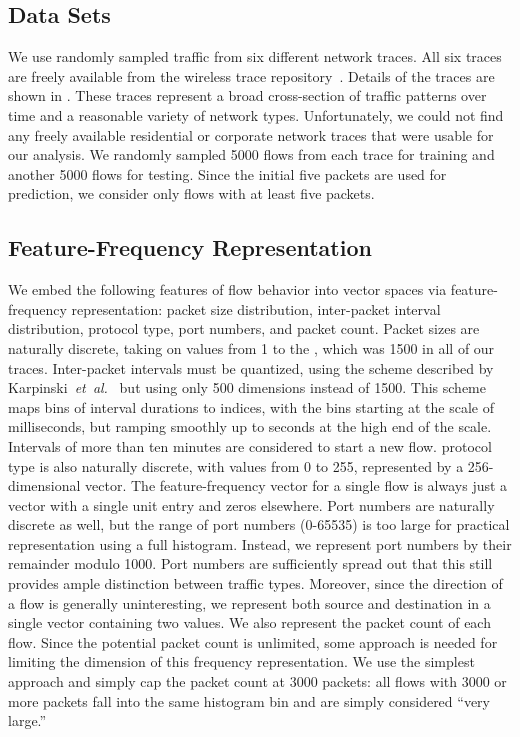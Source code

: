 \documentclass{acm_proc_article-sp}
\begin{document}
\vfill
\break

\subsection{Data Sets}

We use randomly sampled traffic from six different network traces.
All six traces are freely available from the  wireless trace repository~\cite{Yeo06}.
Details of the traces are shown in .
These traces represent a broad cross-section of traffic patterns over time and a reasonable variety of network types.
Unfortunately, we could not find any freely available residential or corporate network traces that were usable for our analysis.
We randomly sampled 5000 flows from each trace for training and another 5000 flows for testing.
Since the initial five packets are used for prediction, we consider only flows with at least five packets.

\subsection{Feature-Frequency Representation}

We embed the following features of flow behavior into vector spaces via feature-frequency representation:
packet size distribution,
inter-packet interval distribution,
 protocol type,
 port numbers,
and packet count.
%
Packet sizes are naturally discrete, taking on values from 1 to the , which was 1500 in all of our traces.
%
Inter-packet intervals must be quantized, using the scheme described by Karpinski~\emph{et~al.}~\cite{Karpinski08} but using only 500 dimensions instead of 1500.
This scheme maps bins of interval durations to indices, with the bins starting at the scale of milliseconds, but ramping smoothly up to seconds at the high end of the scale.
Intervals of more than ten minutes are considered to start a new flow.
%
 protocol type is also naturally discrete, with values from 0 to 255, represented by a 256-dimensional vector.
The feature-frequency vector for a single flow is always just a vector with a single unit entry and zeros elsewhere.
%
Port numbers are naturally discrete as well, but the range of port numbers (0-65535) is too large for practical representation using a full histogram.
Instead, we represent port numbers by their remainder modulo 1000.
Port numbers are sufficiently spread out that this still provides ample distinction between traffic types.
Moreover, since the direction of a flow is generally uninteresting, we represent both source and destination in a single vector containing two values.
%
We also represent the packet count of each flow.
Since the potential packet count is unlimited, some approach is needed for limiting the dimension of this frequency representation.
We use the simplest approach and simply cap the packet count at 3000 packets:
all flows with 3000 or more packets fall into the same histogram bin and are simply considered ``very large.''
\end{document}

